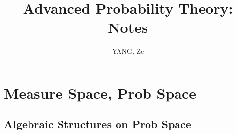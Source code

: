 \documentclass[a4paper,12pt,twoside]{book}
\title{Advanced Probability Theory: Notes}
\author{YANG, Ze}
\begin{document}
\maketitle
\tableofcontents

\chapter{Measure Space, Prob Space}

\section{Algebraic Structures on Prob Space}

\end{document}
